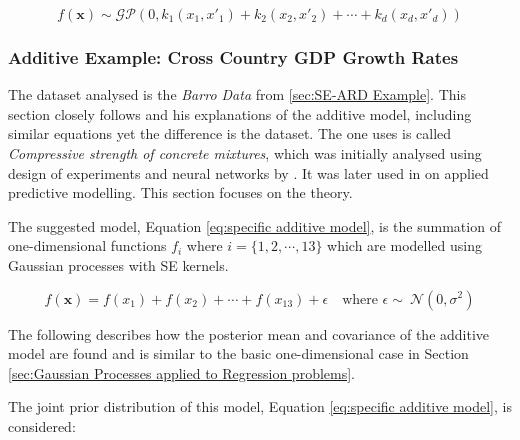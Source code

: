 \documentclass[12pt,a4paper]{article}
\begin{document}
\begin{equation*}
f(\mathbf{x}) \sim \mathcal{GP}(0, k_1(x_1, x'_1) + k_2(x_2, x'_2) + \cdots + k_d(x_d, x'_d))
\label{eq:general additive model}
\end{equation*}

\subsubsection{Additive Example: Cross Country GDP Growth Rates}
\label{sec:Additive Model Example}
 
 The dataset analysed is the \textit{Barro Data} from \ref{sec:SE-ARD Example}. This section closely follows \citet{duvenaud2014automatic} and his explanations of the additive model, including similar equations yet the difference is the dataset. The one \citet{duvenaud2014automatic} uses is called \textit{Compressive strength of concrete mixtures}, which was initially analysed using design of experiments and neural networks by \citet{yeh2006analysis}. It was later used in \citet{kuhn2013applied} on applied predictive modelling. This section focuses on the theory.
 
The suggested model, Equation \eqref{eq:specific additive model}, is the summation of one-dimensional functions \(f_i\) where \(i=\{1,2,\cdots,13\}\) which are modelled using Gaussian processes with SE kernels.

\begin{equation}
f(\mathbf{x}) = f(x_1) + f(x_2) + \cdots + f(x_{13}) + \epsilon \quad \text{where } \epsilon \sim \ \mathcal{N}(0, \sigma^2)
\label{eq:specific additive model}
\end{equation}

The following describes how the posterior mean and covariance of the additive model are found and is similar to the basic one-dimensional case in Section \ref{sec:Gaussian Processes applied to Regression problems}.

The joint prior distribution of this model, Equation \eqref{eq:specific additive model}, is considered:  
\end{document}
